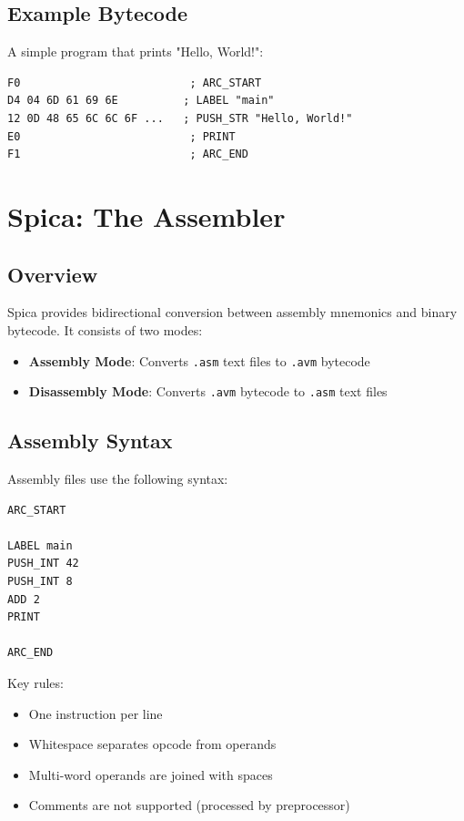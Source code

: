 \documentclass[11pt,a4paper]{article}
\begin{document}
\subsection{Example Bytecode}

A simple program that prints "Hello, World!":

\begin{verbatim}
F0                          ; ARC_START
D4 04 6D 61 69 6E          ; LABEL "main"
12 0D 48 65 6C 6C 6F ...   ; PUSH_STR "Hello, World!"
E0                          ; PRINT
F1                          ; ARC_END
\end{verbatim}

\newpage
\section{Spica: The Assembler}

\subsection{Overview}

Spica provides bidirectional conversion between assembly mnemonics and binary bytecode. It consists of two modes:

\begin{itemize}
    \item \textbf{Assembly Mode}: Converts \texttt{.asm} text files to \texttt{.avm} bytecode
    \item \textbf{Disassembly Mode}: Converts \texttt{.avm} bytecode to \texttt{.asm} text files
\end{itemize}

\subsection{Assembly Syntax}

Assembly files use the following syntax:

\begin{lstlisting}[style=arcturuscode]
ARC_START

LABEL main
PUSH_INT 42
PUSH_INT 8
ADD 2
PRINT

ARC_END
\end{lstlisting}

Key rules:
\begin{itemize}
    \item One instruction per line
    \item Whitespace separates opcode from operands
    \item Multi-word operands are joined with spaces
    \item Comments are not supported (processed by preprocessor)
\end{itemize}
\end{document}

